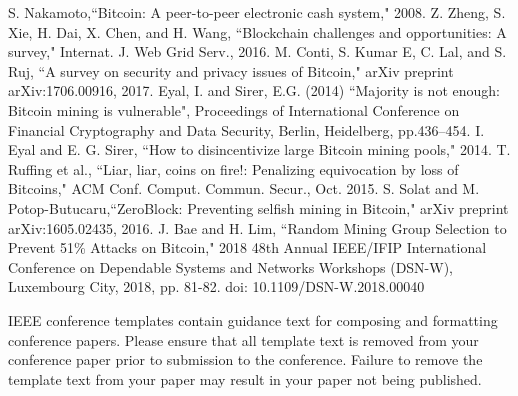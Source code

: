 \documentclass[conference]{IEEEtran}
\begin{document}
\begin{thebibliography}{00}
 S. Nakamoto,``Bitcoin: A peer-to-peer electronic cash system," 2008.
 Z. Zheng, S. Xie, H. Dai, X. Chen, and H. Wang, ``Blockchain challenges
and opportunities: A survey," Internat. J. Web Grid Serv., 2016.
M. Conti, S. Kumar E, C. Lal, and S. Ruj, ``A survey on security and privacy issues of Bitcoin," arXiv preprint arXiv:1706.00916, 2017.
 Eyal, I. and Sirer, E.G. (2014) ``Majority is not enough: Bitcoin mining is vulnerable", Proceedings
of International Conference on Financial Cryptography and Data Security, Berlin, Heidelberg,
pp.436–454.
 I. Eyal and E. G. Sirer, ``How to disincentivize large Bitcoin mining pools," 2014.
 T. Ruffing et al., “Liar, liar, coins on fire!: Penalizing equivocation by loss of Bitcoins," ACM Conf. Comput. Commun. Secur., Oct. 2015.
 S. Solat and M. Potop-Butucaru,``ZeroBlock: Preventing selfish mining in Bitcoin," arXiv preprint arXiv:1605.02435, 2016.
 J. Bae and H. Lim, ``Random Mining Group Selection to Prevent 51\% Attacks on Bitcoin," 2018 48th Annual IEEE/IFIP International Conference on Dependable Systems and Networks Workshops (DSN-W), Luxembourg City, 2018, pp. 81-82.
doi: 10.1109/DSN-W.2018.00040
\end{thebibliography}
\vspace{12pt}
\color{red}
IEEE conference templates contain guidance text for composing and formatting conference papers. Please ensure that all template text is removed from your conference paper prior to submission to the conference. Failure to remove the template text from your paper may result in your paper not being published.
\end{document}
